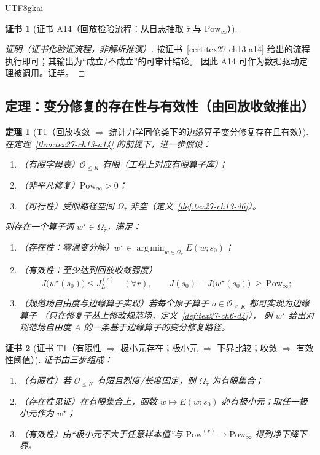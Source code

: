 \documentclass[12pt]{article}
\newtheorem{theorem}{定理}[section]
\newtheorem{Certificate}{证书}[section]
\begin{document}
\begin{CJK*}{UTF8}{gkai}
\begin{Certificate}[证书 A14（回放检验流程：从日志抽取 $\overline{\tau}$ 与 $\mathrm{Pow}_\infty$）]
\begin{enumerate}
\end{enumerate}
\end{Certificate}

\begin{proof}[证明（证书化验证流程，非解析推演）]
按证书~\ref{cert:tex27-ch13-a14} 给出的流程执行即可；其输出为“成立/不成立”的可审计结论。
因此 A14 可作为数据驱动定理被调用。证毕。
\end{proof}

\subsection{定理：变分修复的存在性与有效性（由回放收敛推出）}
\label{subsec:tex27-ch13-theorems}

\begin{theorem}[T1（回放收敛 $\Rightarrow$ 统计力学同伦类下的边缘算子变分修复存在且有效）]
\label{thm:tex27-ch13-t1}
在定理~\ref{thm:tex27-ch13-a14} 的前提下，进一步假设：
\begin{enumerate}
  \item（有限字母表）$\mathcal{O}_{\le K}$ 有限（工程上对应有限算子库）；
  \item（非平凡修复）$\mathrm{Pow}_\infty>0$；
  \item（可行性）受限路径空间 $\Omega_{\overline{\tau}}$ 非空（定义~\ref{def:tex27-ch13-d6}）。
\end{enumerate}
则存在一个算子词 $w^\star\in\Omega_{\overline{\tau}}$，满足：
\begin{enumerate}
  \item（存在性：零温变分解）$w^\star\in\operatorname*{arg\,min}_{w\in\Omega_{\overline{\tau}}}E(w;s_0)$；
  \item（有效性：至少达到回放收敛强度）
  \[
    J\bigl(w^\star(s_0)\bigr)\le J^{(r)}_L\quad(\forall r),
    \qquad
    J(s_0)-J\bigl(w^\star(s_0)\bigr)\ \ge\ \mathrm{Pow}_\infty;
  \]
  \item（规范场自由度与边缘算子实现）若每个原子算子 $o\in\mathcal{O}_{\le K}$ 都可实现为边缘算子
  （只在修复子丛上修改规范场，定义~\ref{def:tex27-ch6-d4}），
  则 $w^\star$ 给出对规范场自由度 $A$ 的一条基于边缘算子的变分修复路径。
\end{enumerate}
\end{theorem}

\begin{Certificate}[证书 T1（有限性 $\Rightarrow$ 极小元存在；极小元 $\Rightarrow$ 下界比较；收敛 $\Rightarrow$ 有效性阈值）]
\label{cert:tex27-ch13-t1}
证书由三步组成：
\begin{enumerate}
  \item（有限性）若 $\mathcal{O}_{\le K}$ 有限且烈度/长度固定，则 $\Omega_{\overline{\tau}}$ 为有限集合；
  \item（存在性见证）在有限集合上，函数 $w\mapsto E(w;s_0)$ 必有极小元；取任一极小元作为 $w^\star$；
  \item（有效性）由“极小元不大于任意样本值”与 $\mathrm{Pow}^{(r)}\to\mathrm{Pow}_\infty$ 得到净下降下界。
\end{enumerate}
\end{Certificate}


\end{CJK*}
\end{document}

